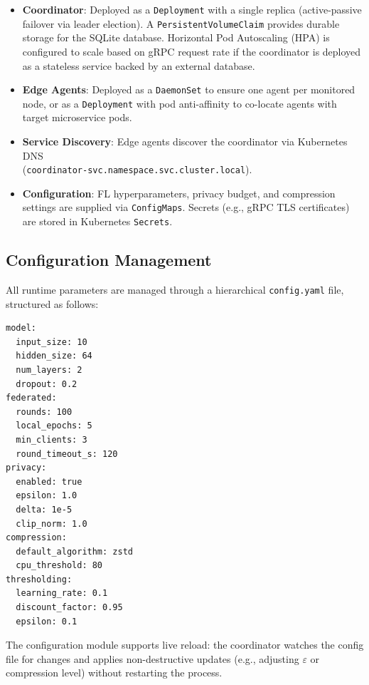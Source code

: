 \begin{itemize}
    \item \textbf{Coordinator}: Deployed as a \texttt{Deployment} with a
    single replica (active-passive failover via leader election). A
    \texttt{PersistentVolumeClaim} provides durable storage for the SQLite
    database. Horizontal Pod Autoscaling (HPA) is configured to scale based
    on gRPC request rate if the coordinator is deployed as a stateless
    service backed by an external database.

    \item \textbf{Edge Agents}: Deployed as a \texttt{DaemonSet} to ensure one
    agent per monitored node, or as a \texttt{Deployment} with pod anti-affinity
    to co-locate agents with target microservice pods.

    \item \textbf{Service Discovery}: Edge agents discover the coordinator via
    Kubernetes DNS \\ (\texttt{coordinator-svc.namespace.svc.cluster.local}).

    \item \textbf{Configuration}: FL hyperparameters, privacy budget, and
    compression settings are supplied via \texttt{ConfigMaps}. Secrets (e.g.,
    gRPC TLS certificates) are stored in Kubernetes \texttt{Secrets}.
\end{itemize}

\subsection{Configuration Management}
\label{subsec:design_config}

All runtime parameters are managed through a hierarchical
\texttt{config.yaml} file, structured as follows:

\begin{verbatim}
model:
  input_size: 10
  hidden_size: 64
  num_layers: 2
  dropout: 0.2
federated:
  rounds: 100
  local_epochs: 5
  min_clients: 3
  round_timeout_s: 120
privacy:
  enabled: true
  epsilon: 1.0
  delta: 1e-5
  clip_norm: 1.0
compression:
  default_algorithm: zstd
  cpu_threshold: 80
thresholding:
  learning_rate: 0.1
  discount_factor: 0.95
  epsilon: 0.1
\end{verbatim}

The configuration module supports live reload: the coordinator watches the
config file for changes and applies non-destructive updates (e.g., adjusting
$\varepsilon$ or compression level) without restarting the process.

